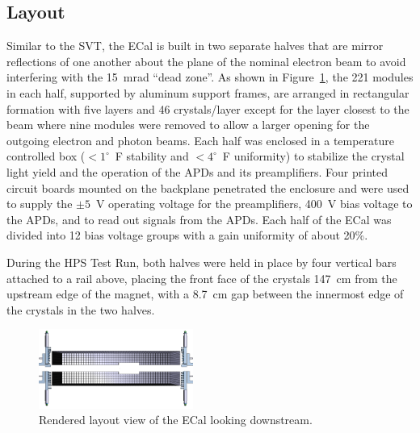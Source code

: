 \documentclass[final,3p,times,twocolumn]{elsarticle}
\begin{document}
\subsection{Layout}
Similar to the SVT, the ECal is built in two separate halves that are mirror reflections of one another 
about the plane of the nominal electron beam to avoid interfering with the 15~mrad ``dead zone''. 
As shown in Figure~\ref{fig:ecal}, the 221 modules in each half, supported by aluminum support frames, 
are arranged in rectangular formation with five layers and 46 crystals/layer except for the layer closest to 
the beam where nine modules were removed to allow a larger opening for the outgoing electron and 
photon beams. Each half was enclosed in a temperature controlled box ($<1^{\circ}$~F stability and 
$<4^{\circ}$~F uniformity) to stabilize the crystal light yield and the operation of the APDs and its 
preamplifiers. 
Four printed circuit boards mounted on the backplane penetrated the enclosure and were used to 
supply the $\pm 5$~V operating voltage for the preamplifiers, 400~V bias voltage to the APDs, and to 
read out signals from the APDs. Each half of the ECal was divided into 12 bias voltage groups with a 
gain uniformity of about 20\%. 

During the HPS Test Run, both halves were held in place by four vertical bars attached to a rail above, 
placing the front face of the crystals 147~cm from the upstream edge of the magnet, with a 
8.7~cm gap between the innermost edge of the crystals in the two halves.
{\small
\begin{figure}[]
\begin{center}
\includegraphics[width=0.45\textwidth]{figures/ECal}
\caption{Rendered layout view of the ECal looking downstream.}
\label{fig:ecal}
\end{center}
\end{figure}
}
\end{document}
